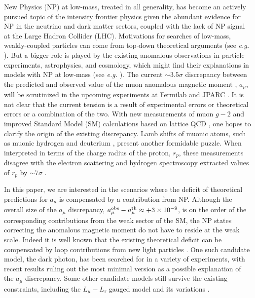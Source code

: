 \documentclass[prd,onecolumn,notitlepage,
nofootinbib,aps,tightenlines,
preprintnumbers,amsmath,amssymb,amsfonts,showpacs,superscriptaddress]{revtex4-1}
\begin{document}
 New Physics (NP) at low-mass, treated in all generality, has become an actively pursued topic of the intensity frontier physics \cite{Hewett:2012ns,Essig:2013lka,Alexander:2016aln} given the abundant evidence for NP in the neutrino and dark matter sectors, coupled with the lack of NP signal at the Large Hadron Collider (LHC).
Motivations for searches of low-mass, weakly-coupled particles can come from 
 top-down theoretical arguments (see {\em e.g.} \cite{Jaeckel:2010ni}). But a bigger role is played by 
the existing anomalous observations in particle experiments, 
astrophysics, and cosmology, which might find their explanations in models with  NP at low-mass
(see {\em e.g.} \cite{Boehm:2003hm,Pospelov:2007mp,ArkaniHamed:2008qn}).
The current $\sim 3.5\sigma$ discrepancy between the predicted and observed value of the muon anomalous magnetic moment
\cite{Bennett:2006fi}, $a_\mu$,  will 
be scrutinized in the upcoming experiments at Fermilab and JPARC \cite{Grange:2015fou,Mibe:2010zz}. 
It is not clear that the current tension is a result of experimental errors or  theoretical errors or a combination of the two. With new measurements of muon $g-2$ and improved Standard Model (SM) calculations 
based on lattice QCD \cite{Benayoun:2014tra, Jin:2016rmu}, one hopes to clarify the origin of the existing discrepancy. 
Lamb shifts of muonic atoms, such as muonic hydrogen and deuterium \cite{Pohl:2010zza,Antognini:1900ns,Pohl1:2016xoo}, 
present another formidable puzzle. When interpreted in terms 
of the charge radius of the proton, $r_p$, these measurements disagree with the electron scattering and hydrogen spectroscopy extracted values of $r_p$ by $\sim 7 \sigma$ \cite{Mohr:2015ccw}. 


In this paper, we are interested in the scenarios where the deficit of 
theoretical predictions for $a_\mu$ is compensated by a contribution
from NP.  Although the overall size of the $a_\mu$ discrepancy, 
$a_\mu^{\rm obs} -  a_\mu^{\rm th} \approx +3\times 10^{-9} $,  is on the order of the 
corresponding contributions from the weak sector of the SM, the NP states correcting the anomalous magnetic moment do not have to reside at the 
weak scale. Indeed it is well known that the existing theoretical deficit can be compensated by loop contributions from new light particles \cite{Gninenko:2001hx,Fayet:2007ua,Pospelov:2008zw}. One such candidate model, the dark photon, has been searched for in a variety of experiments, with recent results ruling out the most minimal version
as a possible explanation of the $a_\mu$ discrepancy. Some other candidate models still survive the existing constraints, including 
the $L_\mu-L_\tau$ gauged model and its variations \cite{Altmannshofer:2014pba,Altmannshofer:2016brv}.
\end{document}

